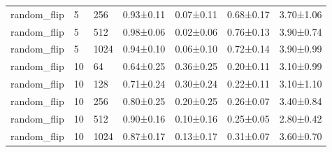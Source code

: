 \begin{tabular}{lllcccc}
random\_flip & 5      & 256                 & 0.93±0.11  & 0.07±0.11              & 0.68±0.17 & 3.70±1.06 \\
random\_flip & 5      & 512                 & 0.98±0.06  & 0.02±0.06              & 0.76±0.13 & 3.90±0.74 \\
random\_flip & 5      & 1024                & 0.94±0.10  & 0.06±0.10              & 0.72±0.14 & 3.90±0.99 \\
random\_flip & 10     & 64                  & 0.64±0.25  & 0.36±0.25              & 0.20±0.11 & 3.10±0.99 \\
random\_flip & 10     & 128                 & 0.71±0.24  & 0.30±0.24              & 0.22±0.11 & 3.10±1.10 \\
random\_flip & 10     & 256                 & 0.80±0.25  & 0.20±0.25              & 0.26±0.07 & 3.40±0.84 \\
random\_flip & 10     & 512                 & 0.90±0.16  & 0.10±0.16              & 0.25±0.05 & 2.80±0.42 \\
random\_flip & 10     & 1024                & 0.87±0.17  & 0.13±0.17              & 0.31±0.07 & 3.60±0.70 \\
\bottomrule
\end{tabular}
